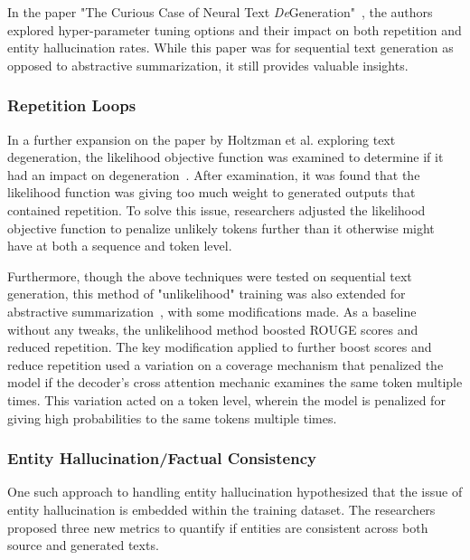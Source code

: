 \documentclass[12pt]{report}
\begin{document}
        In the paper "The Curious Case of Neural Text \textit{De}Generation"~\cite{Degen}, the authors explored hyper-parameter tuning options and their impact on both repetition and entity hallucination rates. While this paper was for sequential text generation as opposed to abstractive summarization, it still provides valuable insights.
        
        \subsubsection{Repetition Loops}
            In a further expansion on the paper by Holtzman et al. exploring text degeneration, the likelihood objective function was examined to determine if it had an impact on degeneration~\cite{Anon}. After examination, it was found that the likelihood function was giving too much weight to generated outputs that contained repetition. To solve this issue, researchers adjusted the likelihood objective function to penalize unlikely tokens further than it otherwise might have at both a sequence and token level.
            
            Furthermore, though the above techniques were tested on sequential text generation, this method of "unlikelihood" training was also extended for abstractive summarization~\cite{unlik}, with some modifications made. As a baseline without any tweaks, the unlikelihood method boosted ROUGE scores and reduced repetition. The key modification applied to further boost scores and reduce repetition used a variation on a coverage mechanism that penalized the model if the decoder's cross attention mechanic examines the same token multiple times. This variation acted on a token level, wherein the model is penalized for giving high probabilities to the same tokens multiple times.
            
        \subsubsection{Entity Hallucination/Factual Consistency}
            One such approach to handling entity hallucination hypothesized that the issue of entity hallucination is embedded within the training dataset. The researchers~\cite{hallucinate} proposed three new metrics to quantify if entities are consistent across both source and generated texts. 
            
\end{document}
